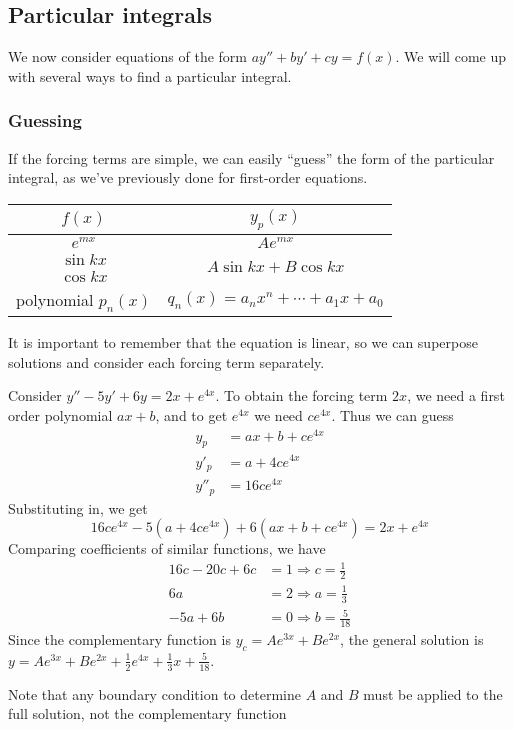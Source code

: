 \documentclass[a4paper]{article}
\begin{document}
\subsection{Particular integrals}
We now consider equations of the form $ay'' + by' + cy = f(x)$. We will come up with several ways to find a particular integral.

\subsubsection{Guessing}
If the forcing terms are simple, we can easily ``guess'' the form of the particular integral, as we've previously done for first-order equations.
\begin{center}
  \begin{tabular}{cc}
    \toprule
    $f(x)$ & $y_p(x)$\\
    \midrule
    $e^{mx}$ & $Ae^{mx}$\\
    $\sin kx$ & \multirow{2}{*}{$A\sin kx + B\cos kx$}\\
    $\cos kx$ & \\
    polynomial $p_n(x)$ & $q_n(x) = a_nx^n + \cdots + a_1x + a_0$\\
    \bottomrule
  \end{tabular}
\end{center}
It is important to remember that the equation is linear, so we can superpose solutions and consider each forcing term separately.

\begin{eg}
  Consider $y'' - 5y' + 6y = 2x + e^{4x}$. To obtain the forcing term $2x$, we need a first order polynomial $ax + b$, and to get $e^{4x}$ we need $ce^{4x}$. Thus we can guess
  \begin{align*}
    y_p &= ax + b + ce^{4x}\\
    y'_p &= a + 4ce^{4x}\\
    y''_p &= 16ce^{4x}
  \end{align*}
  Substituting in, we get
  \[
    16ce^{4x} - 5(a + 4ce^{4x}) + 6(ax + b + ce^{4x}) = 2x + e^{4x}
  \]
  Comparing coefficients of similar functions, we have
  \begin{align*}
    16c - 20c + 6c &= 1\Rightarrow c = \frac{1}{2}\\
    6a &= 2 \Rightarrow a = \frac{1}{3}\\
    -5a + 6b &= 0 \Rightarrow b = \frac{5}{18}
  \end{align*}
  Since the complementary function is $y_c = Ae^{3x} + Be^{2x}$, the general solution is $y = Ae^{3x} + Be^{2x} + \frac{1}{2}e^{4x} + \frac{1}{3}x + \frac{5}{18}$.

  Note that any boundary condition to determine $A$ and $B$ must be applied to the full solution, not the complementary function
\end{eg}
\end{document}
